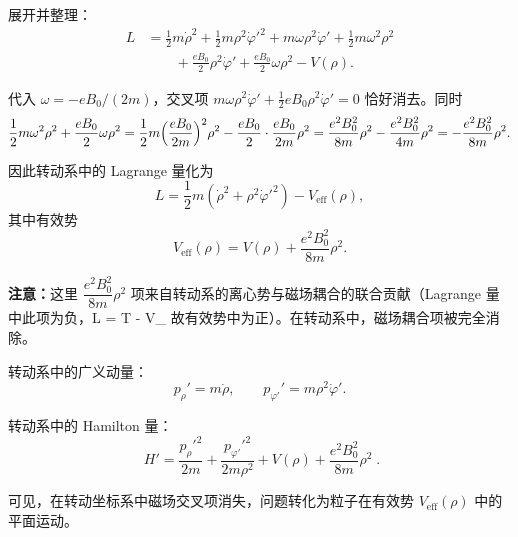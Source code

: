 \begin{question}
\begin{solution}
展开并整理：
\[
\begin{aligned}
L &= \frac12 m\dot\rho^2 + \frac12 m\rho^2\dot\varphi'^2
+ m\omega\rho^2\dot\varphi' + \frac12 m\omega^2\rho^2 \\
&\qquad + \frac{eB_0}{2}\rho^2\dot\varphi' + \frac{eB_0}{2}\omega\rho^2 - V(\rho).
\end{aligned}
\]

代入 \(\omega = -eB_0/(2m)\)，交叉项 \(m\omega\rho^2\dot\varphi' + \frac12 eB_0\rho^2\dot\varphi' = 0\) 恰好消去。同时
\[
\frac12 m\omega^2\rho^2 + \frac{eB_0}{2}\omega\rho^2
= \frac12 m\Bigl(\frac{eB_0}{2m}\Bigr)^2\rho^2
- \frac{eB_0}{2}\cdot\frac{eB_0}{2m}\rho^2
= \frac{e^2 B_0^2}{8m}\rho^2 - \frac{e^2 B_0^2}{4m}\rho^2
= -\frac{e^2 B_0^2}{8m}\rho^2 .
\]

因此转动系中的 Lagrange 量化为
\[
L = \frac12 m(\dot\rho^2 + \rho^2\dot\varphi'^2) - V_{\text{eff}}(\rho),
\]
其中有效势
\[
V_{\text{eff}}(\rho) = V(\rho) + \frac{e^2 B_0^2}{8m}\rho^2 .
\]

\textbf{注意：}这里 \(\dfrac{e^2 B_0^2}{8m}\rho^2\) 项来自转动系的离心势与磁场耦合的联合贡献（Lagrange 量中此项为负，L = T - V_{} 故有效势中为正）。在转动系中，磁场耦合项被完全消除。

转动系中的广义动量：
\[
p_\rho' = m\dot\rho,\qquad p_{\varphi'}' = m\rho^2\dot\varphi' .
\]

转动系中的 Hamilton 量：
\[
\boxed{\;H' = \frac{p_\rho'^2}{2m} + \frac{p_{\varphi'}'^2}{2m\rho^2}
+ V(\rho) + \frac{e^2 B_0^2}{8m}\rho^2\;}.
\]

可见，在转动坐标系中磁场交叉项消失，问题转化为粒子在有效势 \(V_{\text{eff}}(\rho)\) 中的平面运动。
\end{solution}
\end{question}
